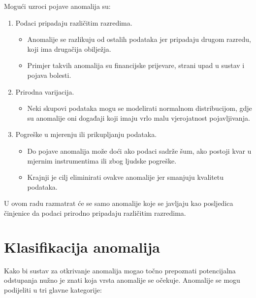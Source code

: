 \documentclass[utf8, diplomski, numeric]{fer}
\begin{document}
Mogući uzroci pojave anomalija su:
\begin{enumerate}
\item Podaci pripadaju različitim razredima.
\begin{itemize}
\item Anomalije se razlikuju od ostalih podataka jer pripadaju drugom razredu, koji ima drugačija obilježja.
\item Primjer takvih anomalija su financijske prijevare, strani upad u sustav i pojava bolesti.
\end{itemize}
\item Prirodna varijacija.
\begin{itemize}
\item Neki skupovi podataka mogu se modelirati normalnom distribucijom, gdje su anomalije oni događaji koji imaju vrlo malu vjerojatnost pojavljivanja.
\end{itemize}
\item Pogreške u mjerenju ili prikupljanju podataka.
\begin{itemize}
\item Do pojave anomalija može doći ako podaci sadrže šum, ako postoji kvar u mjernim instrumentima ili zbog ljudske pogreške.
\item Krajnji je cilj eliminirati ovakve anomalije jer smanjuju kvalitetu podataka.
\end{itemize}
\end{enumerate}

U ovom radu razmatrat će se samo anomalije koje se javljaju kao posljedica činjenice da podaci prirodno pripadaju različitim razredima.

\section{Klasifikacija anomalija}
Kako bi sustav za otkrivanje anomalija mogao točno prepoznati potencijalna odstupanja nužno je znati koja vrsta anomalije se očekuje. Anomalije se mogu podijeliti u tri glavne kategorije:
\end{document}

